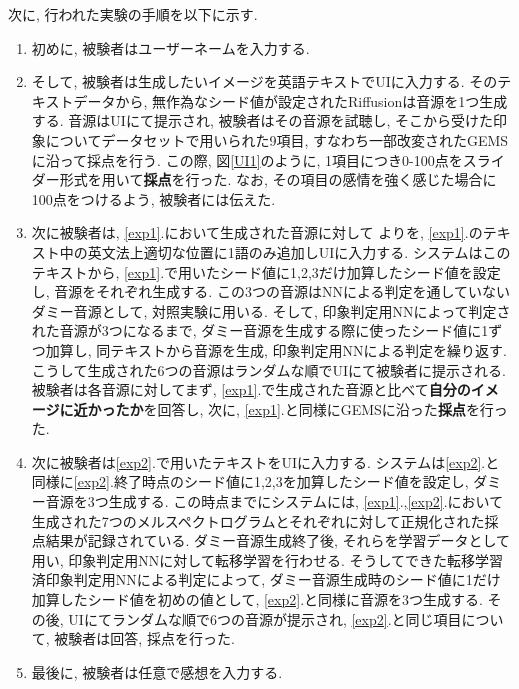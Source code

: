 \documentclass[a4paper,11pt,dvipdfmx]{jreport}
\begin{document}
次に, 行われた実験の手順を以下に示す.
\begin{enumerate}
  \item 初めに, 被験者はユーザーネームを入力する.
  \item そして, 被験者は生成したいイメージを英語テキストでUIに入力する.
        そのテキストデータから, 無作為なシード値が設定されたRiffusionは音源を1つ生成する.
        音源はUIにて提示され, 被験者はその音源を試聴し, そこから受けた印象についてデータセットで用いられた9項目, すなわち一部改変されたGEMSに沿って採点を行う.
        この際, 図\ref{UI1}のように, 1項目につき0-100点をスライダー形式を用いて\textbf{採点}を行った. なお, その項目の感情を強く感じた場合に100点をつけるよう, 被験者には伝えた.\label{exp1}
  \item 次に被験者は, \ref{exp1}.において生成された音源に対して
        よりを, 
        \ref{exp1}.のテキスト中の英文法上適切な位置に1語のみ追加しUIに入力する.
        システムはこのテキストから, \ref{exp1}.で用いたシード値に1,2,3だけ加算したシード値を設定し, 音源をそれぞれ生成する. この3つの音源はNNによる判定を通していないダミー音源として, 対照実験に用いる. そして, 印象判定用NNによって判定された音源が3つになるまで, ダミー音源を生成する際に使ったシード値に1ずつ加算し, 同テキストから音源を生成, 印象判定用NNによる判定を繰り返す. こうして生成された6つの音源はランダムな順でUIにて被験者に提示される. 被験者は各音源に対してまず, \ref{exp1}.で生成された音源と比べて\textbf{自分のイメージに近かったか}を回答し, 次に, \ref{exp1}.と同様にGEMSに沿った\textbf{採点}を行った.\label{exp2}
  \item 次に被験者は\ref{exp2}.で用いたテキストをUIに入力する.
        システムは\ref{exp2}.と同様に\ref{exp2}.終了時点のシード値に1,2,3を加算したシード値を設定し, ダミー音源を3つ生成する.
        この時点までにシステムには, \ref{exp1}.,\ref{exp2}.において生成された7つのメルスペクトログラムとそれぞれに対して正規化された採点結果が記録されている.
        ダミー音源生成終了後, それらを学習データとして用い, 印象判定用NNに対して転移学習を行わせる. そうしてできた転移学習済印象判定用NNによる判定によって, ダミー音源生成時のシード値に1だけ加算したシード値を初めの値として, \ref{exp2}.と同様に音源を3つ生成する.
        その後, UIにてランダムな順で6つの音源が提示され, \ref{exp2}.と同じ項目について, 被験者は回答, 採点を行った.\label{exp3}
  \item 最後に, 被験者は任意で感想を入力する.
\end{enumerate}
\end{document}
